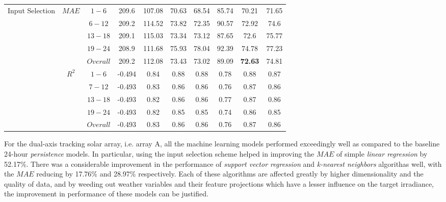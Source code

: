 \begin{table}[h]
\begin{center}
\begin{tabular}{@{}p{5.3em}ccccccccc@{}}
    & & & & & & & & & \\
    \midrule
    \multirow{10}{5em}{Input Selection}
                                              & \multirow{5}{*}{$MAE$} & $1 - 6$ & 209.6 & 107.08 & 70.63 & 68.54 & 85.74 & 70.21 & 71.65 \\
                                              &                   & $6 - 12$ & 209.2 & 114.52 & 73.82 & 72.35 & 90.57 & 72.92 & 74.6 \\
                                              &                   & $13 - 18$ & 209.1 & 115.03 & 73.34 & 73.12 & 87.65 & 72.6 & 75.77 \\
                                              &                   & $19 - 24$ & 208.9 & 111.68 & 75.93 & 78.04 & 92.39 & 74.78 & 77.23 \\
                                              &                   & $Overall$ & 209.2 & 112.08 & 73.43 & 73.02 & 89.09 & \textbf{72.63} & 74.81 \\ \cmidrule(lr){2-10}
                                              & \multirow{5}{*}{$R^2$} & $1 - 6$ & -0.494 & 0.84 & 0.88 & 0.88 & 0.78 & 0.88 & 0.87 \\
                                              &                   & $7 - 12$ & -0.493 & 0.83 & 0.86 & 0.86 & 0.76 & 0.87 & 0.86 \\
                                              &                   & $13 - 18$ & -0.493 & 0.82 & 0.86 & 0.86 & 0.77 & 0.87 & 0.86 \\
                                              &                   & $19 - 24$ & -0.493 & 0.82 & 0.85 & 0.85 & 0.74 & 0.86 & 0.85 \\
                                              &                   & $Overall$ & -0.493 & 0.83 & 0.86 & 0.86 & 0.76 & 0.87 & 0.86 \\ 
    \bottomrule
    \end{tabular}
\end{center}
\end{table}

\par For the dual-axis tracking solar array, i.e. array A, all the machine learning models performed exceedingly well as compared to the baseline 24-hour \textit{persistence} models. In particular, using the input selection scheme helped in improving the $MAE$ of simple \textit{linear regression} by 52.17\%. There was a considerable improvement in the performance of \textit{support vector regression} and \textit{k-nearest neighbors} algorithas well, with the $MAE$ reducing by 17.76\% and 28.97\% respectively. Each of these algorithms are affected greatly by higher dimensionality and the quality of data, and by weeding out weather variables and their feature projections which have a lesser influence on the target irradiance, the improvement in performance of these models can be justified.   

